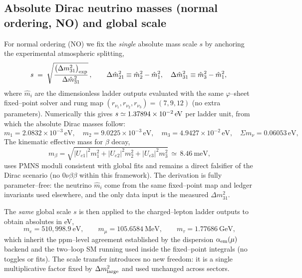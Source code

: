 \documentclass[11pt]{article}
\begin{document}
\subsection{Absolute Dirac neutrino masses (normal ordering, NO) and global scale}
For normal ordering (NO) we fix the \emph{single} absolute mass scale $s$ by anchoring the experimental atmospheric splitting,
\[
s \;=\; \sqrt{\frac{\bigl(\Delta m^2_{31}\bigr)_{\rm exp}}{\Delta\hat m^2_{31}}}\,,\qquad
\Delta\hat m^2_{21}\equiv \hat m_2^2-\hat m_1^2,\quad \Delta\hat m^2_{31}\equiv \hat m_3^2-\hat m_1^2,\
\]
where $\hat m_i$ are the dimensionless ladder outputs evaluated with the same $\varphi$--sheet fixed--point solver and rung map $(r_{\nu_1},r_{\nu_2},r_{\nu_3})=(7,9,12)$ (no extra parameters). Numerically this gives
$s \simeq 1.37894\times10^{-2}\,{\rm eV}$ per ladder unit, from which the absolute Dirac masses follow:
\[
m_1=2.0832\times10^{-3}\,\text{eV},\quad
m_2=9.0225\times10^{-3}\,\text{eV},\quad
m_3=4.9427\times10^{-2}\,\text{eV},\quad
\Sigma m_\nu=0.06053\,\text{eV},
\]
The kinematic effective mass for $\beta$ decay,
\[
m_\beta = \sqrt{|U_{e1}|^2m_1^2+|U_{e2}|^2m_2^2+|U_{e3}|^2 m_3^2}\,\simeq\,8.46~\text{meV},
\]
uses PMNS moduli consistent with global fits \cite{NuFIT52} and remains a direct falsifier of the Dirac scenario (no $0\nu\beta\beta$ within this framework). The derivation is fully parameter--free: the neutrino $\hat m_i$ come from the same fixed--point map and ledger invariants used elsewhere, and the only data input is the measured $\Delta m^2_{31}$.

The \emph{same} global scale $s$ is then applied to the charged--lepton ladder outputs to obtain absolutes in eV,
\[
m_e=510{,}998.9~\text{eV},\qquad
m_\mu=105.6584~\text{MeV},\qquad
m_\tau=1.77686~\text{GeV},
\]
which inherit the ppm--level agreement established by the dispersion $\alpha_{\rm em}(\mu)$ backend and the two--loop SM running used inside the fixed--point integrals (no toggles or fits). The scale transfer introduces no new freedom: it is a single multiplicative factor fixed by $\Delta m^2_{\rm large}$ and used unchanged across sectors.
\end{document}
